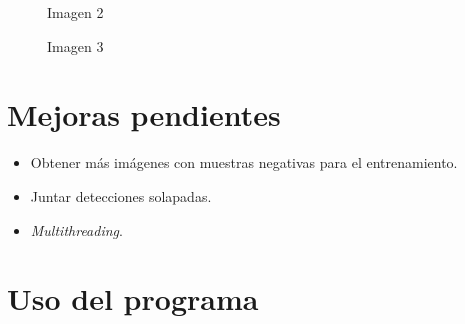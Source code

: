 \documentclass[11pt,spanish,a4paper]{article} %
\begin{document}
\begin{figure}[H]
\caption{Imagen 2}
\label{fig:det2}
\end{figure}

\begin{figure}[H]
\caption{Imagen 3}
\label{fig:det3}
\end{figure}

\section{Mejoras pendientes}

\begin{itemize}
\item Obtener más imágenes con muestras negativas para el entrenamiento.
\item Juntar detecciones solapadas.
\item \textit{Multithreading}.
\end{itemize}

\section{Uso del programa}
\end{document}

